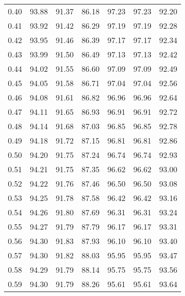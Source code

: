 \begin{tabular}{|c|c|c|c|c|c|c|}
      0.40 &     93.88 &     91.37 &      86.18 &   97.23 &      97.23 &         92.20 \\
      0.41 &     93.92 &     91.42 &      86.29 &   97.19 &      97.19 &         92.28 \\
      0.42 &     93.95 &     91.46 &      86.39 &   97.17 &      97.17 &         92.34 \\
      0.43 &     93.99 &     91.50 &      86.49 &   97.13 &      97.13 &         92.42 \\
      0.44 &     94.02 &     91.55 &      86.60 &   97.09 &      97.09 &         92.49 \\
      0.45 &     94.05 &     91.58 &      86.71 &   97.04 &      97.04 &         92.56 \\
      0.46 &     94.08 &     91.61 &      86.82 &   96.96 &      96.96 &         92.64 \\
      0.47 &     94.11 &     91.65 &      86.93 &   96.91 &      96.91 &         92.72 \\
      0.48 &     94.14 &     91.68 &      87.03 &   96.85 &      96.85 &         92.78 \\
      0.49 &     94.18 &     91.72 &      87.15 &   96.81 &      96.81 &         92.86 \\
      0.50 &     94.20 &     91.75 &      87.24 &   96.74 &      96.74 &         92.93 \\
      0.51 &     94.21 &     91.75 &      87.35 &   96.62 &      96.62 &         93.00 \\
      0.52 &     94.22 &     91.76 &      87.46 &   96.50 &      96.50 &         93.08 \\
      0.53 &     94.25 &     91.78 &      87.58 &   96.42 &      96.42 &         93.16 \\
      0.54 &     94.26 &     91.80 &      87.69 &   96.31 &      96.31 &         93.24 \\
      0.55 &     94.27 &     91.79 &      87.79 &   96.17 &      96.17 &         93.31 \\
      0.56 &     94.30 &     91.83 &      87.93 &   96.10 &      96.10 &         93.40 \\
      0.57 &     94.30 &     91.82 &      88.03 &   95.95 &      95.95 &         93.47 \\
      0.58 &     94.29 &     91.79 &      88.14 &   95.75 &      95.75 &         93.56 \\
      0.59 &     94.30 &     91.79 &      88.26 &   95.61 &      95.61 &         93.64 \\

\end{tabular}
